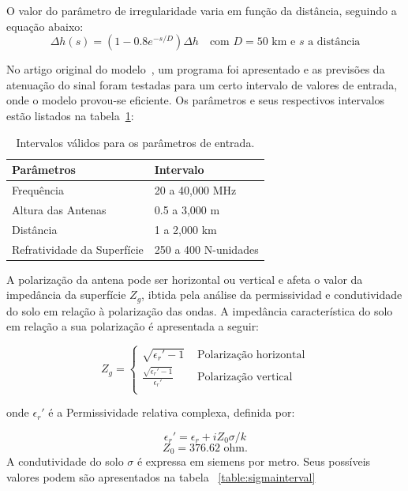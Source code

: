 O valor do parâmetro de irregularidade varia em função da distância, seguindo a equação abaixo: 
\[
\Delta h(s) = (1-0.8e^{-s/D})\Delta h \,\,\,\, \text{ com $D = 50 $ km e $s$ a distância}
\]

No artigo original do modelo~\cite{longleyrice}, um programa foi apresentado e as previsões da atenuação do sinal foram testadas para um certo intervalo de valores de entrada, onde o modelo provou-se eficiente. Os parâmetros e seus respectivos intervalos estão listados na tabela~\ref{table:longleyricevaluesinterval}:\\

\begin{table}[h]
\centering
\caption[Intervalos válidos para os parâmetros de entrada.]
{Intervalos válidos para os parâmetros de entrada.}
\label{table:longleyricevaluesinterval}
\begin{tabular}{ll}
\hline
Parâmetros                  & Intervalo            \\ \hline
Frequência                  & 20 a 40,000 MHz      \\
Altura das Antenas          & 0.5 a 3,000 m        \\
Distância                   & 1 a 2,000 km         \\
Refratividade da Superfície & 250 a 400 N-unidades
\end{tabular}
\end{table}

A polarização da antena pode ser horizontal ou vertical e afeta o valor da impedância da superfície \begin{math}Z_g\end{math}, ibtida pela análise da permissividad e condutividade do solo em relação à polarização das ondas. A impedância característica do solo em relação a sua polarização é apresentada a seguir:


\[ Z_g = \begin{cases} 
      \sqrt{\epsilon_r' - 1} & \textrm{ Polarização horizontal} \\
      \frac{\sqrt{\epsilon_r' - 1}}{\epsilon_r'} & \textrm{ Polarização vertical} \\
   \end{cases} \]

onde \begin{math}\epsilon_r'\end{math} é a Permissividade relativa complexa, definida por:

\[ 
\epsilon_r' = \epsilon_r + i Z_0\sigma/k
\]
\[
Z_0 = 376.62 \textrm{ ohm.}
\]
A condutividade do solo $\sigma$ é expressa em siemens por metro. Seus possíveis valores podem são apresentados na tabela ~\ref{table:sigmainterval}

